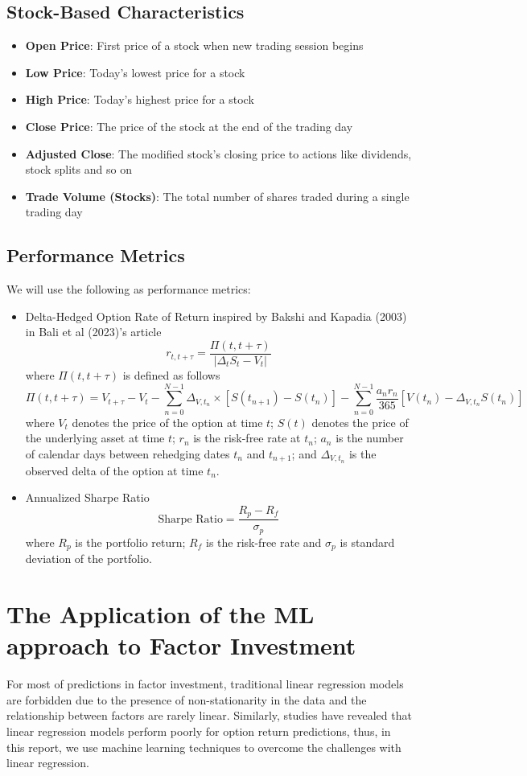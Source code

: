 \documentclass[oneside, 12pt]{article}
\newcommand*{\1}{\text{\scalebox{1.1}{\usefont{U}{bbold}{m}{n}1}}}
\begin{document}
\subsection{Stock-Based Characteristics}
\begin{itemize}
\item \textbf{Open Price}: First price of a stock when new trading session begins
\item \textbf{Low Price}: Today's lowest price for a stock
\item \textbf{High Price}: Today's highest price for a stock
\item \textbf{Close Price}: The price of the stock at the end of the trading day
\item \textbf{Adjusted Close}: The modified stock's closing price to actions like dividends, stock splits and so on 
\item \textbf{Trade Volume (Stocks)}: The total number of shares traded during a single trading day
\end{itemize}


\subsection{Performance Metrics}
We will use the following as performance metrics:
\begin{itemize}
\item Delta-Hedged Option Rate of Return inspired by Bakshi and Kapadia (2003) in Bali et al (2023)'s article 
$$
r_{t, t + \tau} = \frac{\Pi (t, t + \tau)}{|\Delta_t S_t - V_t|}
$$
where $\Pi(t, t + \tau)$ is defined as follows
$$
\Pi (t, t + \tau) = V_{t + \tau} - V_t - \sum_{n = 0}^{N - 1} \Delta_{V, t_n} \times [S(t_{n + 1}) - S(t_n)] - \sum_{n = 0}^{N - 1} \frac{a_n r_n}{365} [V(t_n) - \Delta_{V, t_n} S(t_n)]
$$
where $V_t$ denotes the price of the option at time $t$; $S(t)$ denotes the price of the underlying asset at time $t$; $r_n$ is the risk-free rate at $t_n$; $a_n$ is the number of calendar days between rehedging dates $t_n$ and $t_{n + 1}$; and $\Delta_{V, t_n}$ is the observed delta of the option at time $t_n$.
\item Annualized Sharpe Ratio
$$
\mathrm{Sharpe \,\, Ratio} = \frac{R_p - R_f}{\sigma_p}
$$
where $R_p$ is the portfolio return; $R_f$ is the risk-free rate and $\sigma_p$ is standard deviation of the portfolio. 
\end{itemize}
\newpage

\section{The Application of the ML approach to Factor Investment}
For most of predictions in factor investment, traditional linear regression models are forbidden due to the presence of non-stationarity in the data and the relationship between factors are rarely linear. Similarly, studies have revealed that linear regression models perform poorly for option return predictions, thus, in this report, we use machine learning techniques to overcome the challenges with linear regression.
\end{document}
